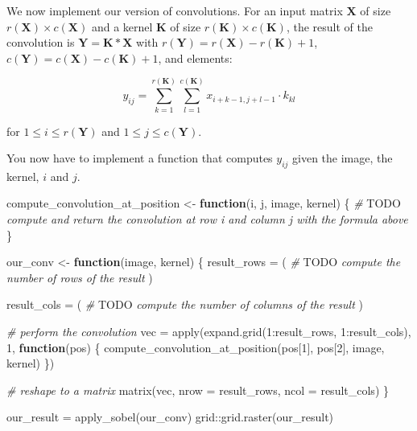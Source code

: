 \documentclass[
  a4paper,
]{article}
\newenvironment{Shaded}{\begin{snugshade}}{\end{snugshade}}
\newcommand{\AlertTok}[1]{\textcolor[rgb]{0.94,0.16,0.16}{#1}}
\newcommand{\AttributeTok}[1]{\textcolor[rgb]{0.77,0.63,0.00}{#1}}
\newcommand{\CommentTok}[1]{\textcolor[rgb]{0.56,0.35,0.01}{\textit{#1}}}
\newcommand{\ControlFlowTok}[1]{\textcolor[rgb]{0.13,0.29,0.53}{\textbf{#1}}}
\newcommand{\DecValTok}[1]{\textcolor[rgb]{0.00,0.00,0.81}{#1}}
\newcommand{\FunctionTok}[1]{\textcolor[rgb]{0.00,0.00,0.00}{#1}}
\newcommand{\NormalTok}[1]{#1}
\newcommand{\OtherTok}[1]{\textcolor[rgb]{0.56,0.35,0.01}{#1}}
\newcommand{\SpecialCharTok}[1]{\textcolor[rgb]{0.00,0.00,0.00}{#1}}
\begin{document}
We now implement our version of convolutions. For an input matrix
\(\textbf{X}\) of size \(r(\textbf{X})\times c(\textbf{X})\) and a
kernel \(\textbf{K}\) of size \(r(\textbf{K})\times c(\textbf{K})\), the
result of the convolution is \(\textbf{Y}=\textbf{K}*\textbf{X}\) with
\(r(\textbf{Y})=r(\textbf{X})-r(\textbf{K})+1\),
\(c(\textbf{Y})=c(\textbf{X})-c(\textbf{K})+1\), and elements:

\begin{equation}
y_{ij}=\sum_{k=1}^{r(\textbf{K})}\sum_{l=1}^{c(\textbf{K})}x_{i+k-1,j+l-1}\cdot k_{kl}
\end{equation}

for \(1\leq i \leq r(\textbf{Y})\) and \(1\leq j \leq c(\textbf{Y})\).

You now have to implement a function that computes \(y_{ij}\) given the
image, the kernel, \(i\) and \(j\).

\begin{Shaded}
\begin{Highlighting}[]
\NormalTok{compute\_convolution\_at\_position }\OtherTok{\textless{}{-}} \ControlFlowTok{function}\NormalTok{(i, j, image, kernel) \{}
  \CommentTok{\# }\AlertTok{TODO}\CommentTok{ compute and return the convolution at row i and column j with the formula above}
\NormalTok{\}}


\NormalTok{our\_conv }\OtherTok{\textless{}{-}} \ControlFlowTok{function}\NormalTok{(image, kernel) \{}
\NormalTok{  result\_rows }\OtherTok{=}\NormalTok{ (}
    \CommentTok{\# }\AlertTok{TODO}\CommentTok{ compute the number of rows of the result}
\NormalTok{  )}
  
\NormalTok{  result\_cols }\OtherTok{=}\NormalTok{ (}
    \CommentTok{\# }\AlertTok{TODO}\CommentTok{ compute the number of columns of the result}
\NormalTok{  )}

  \CommentTok{\# perform the convolution}
\NormalTok{  vec }\OtherTok{=} \FunctionTok{apply}\NormalTok{(}\FunctionTok{expand.grid}\NormalTok{(}\DecValTok{1}\SpecialCharTok{:}\NormalTok{result\_rows, }\DecValTok{1}\SpecialCharTok{:}\NormalTok{result\_cols), }\DecValTok{1}\NormalTok{, }\ControlFlowTok{function}\NormalTok{(pos) \{}
    \FunctionTok{compute\_convolution\_at\_position}\NormalTok{(pos[}\DecValTok{1}\NormalTok{], pos[}\DecValTok{2}\NormalTok{], image, kernel)}
\NormalTok{  \})}
  
  \CommentTok{\# reshape to a matrix}
  \FunctionTok{matrix}\NormalTok{(vec, }\AttributeTok{nrow =}\NormalTok{ result\_rows, }\AttributeTok{ncol =}\NormalTok{ result\_cols)}
\NormalTok{\}}

\NormalTok{our\_result }\OtherTok{=} \FunctionTok{apply\_sobel}\NormalTok{(our\_conv)}
\NormalTok{grid}\SpecialCharTok{::}\FunctionTok{grid.raster}\NormalTok{(our\_result)}
\end{Highlighting}
\end{Shaded}
\end{document}
